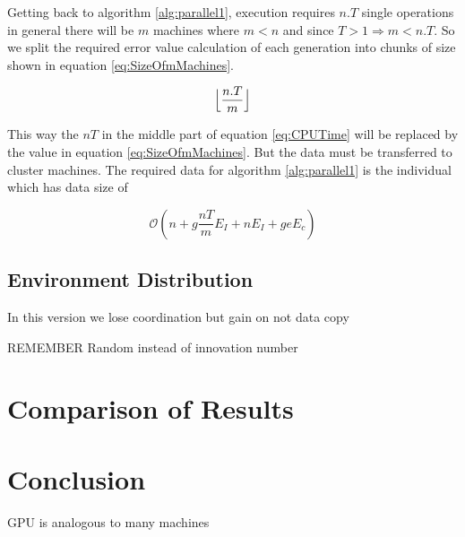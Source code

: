 \documentclass[twocolumn]{article}
\begin{document}
Getting back to algorithm \ref{alg:parallel1}, execution requires $n.T$ single operations in general there will be $m$ machines where $m<n$ and since $T>1 \Rightarrow m<n.T$. So we split the required error value calculation of each generation into chunks of size shown in equation \ref{eq:SizeOfmMachines}.

\begin{equation}
    \label{eq:SizeOfmMachines}
    \Bigl\lfloor \frac{n.T}{m} \Bigr\rfloor    
\end{equation}

This way the $nT$ in the middle part of equation \ref{eq:CPUTime} will be replaced by the value in equation \ref{eq:SizeOfmMachines}. But the data must be transferred to cluster machines. The required data for algorithm \ref{alg:parallel1} is the individual which has data size of 

\begin{equation}
    \label{eq:GPUTime}
    \mathcal{O}(n+g \frac{nT}{m}E_I+nE_I+geE_c)
\end{equation}

\subsection{Environment Distribution}
In this version we lose coordination but gain on not data copy

REMEMBER
Random instead of innovation number


\section{Comparison of Results}


\section{Conclusion}

GPU is analogous to many machines




\end{document}
